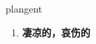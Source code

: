 
\begin{frame}
{\huge plangent}
\begin{center}
\begin{enumerate}\Large
  \item \textbf{凄凉的，哀伤的}
\end{enumerate}
\end{center}
\end{frame}
